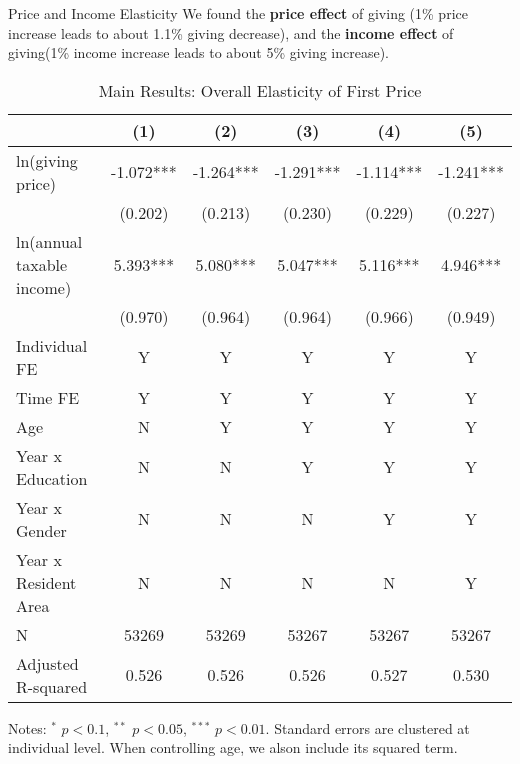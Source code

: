 \documentclass[
  ignorenonframetext,
  aspectratio=169,
]{beamer}
\begin{document}
\begin{frame}{Price and Income Elasticity}
\protect\hypertarget{price-and-income-elasticity}{}
We found the \textbf{price effect} of giving (1\% price increase leads to about 1.1\% giving decrease),
and the \textbf{income effect} of giving(1\% income increase leads to about 5\% giving increase).

\begin{table}

\caption{\label{tab:MainOverall}Main Results: Overall Elasticity of First Price}
\centering
\fontsize{7}{9}\selectfont
\begin{threeparttable}
\begin{tabular}[t]{lccccc}
\toprule
 & (1) & (2) & (3) & (4) & (5)\\
\midrule
ln(giving price) & -1.072*** & -1.264*** & -1.291*** & -1.114*** & -1.241***\\
 & (0.202) & (0.213) & (0.230) & (0.229) & (0.227)\\
ln(annual taxable income) & 5.393*** & 5.080*** & 5.047*** & 5.116*** & 4.946***\\
 & (0.970) & (0.964) & (0.964) & (0.966) & (0.949)\\
Individual FE & Y & Y & Y & Y & Y\\
Time FE & Y & Y & Y & Y & Y\\
Age & N & Y & Y & Y & Y\\
Year x Education & N & N & Y & Y & Y\\
Year x Gender & N & N & N & Y & Y\\
Year x Resident Area & N & N & N & N & Y\\
N & 53269 & 53269 & 53267 & 53267 & 53267\\
Adjusted R-squared & 0.526 & 0.526 & 0.526 & 0.527 & 0.530\\
\bottomrule
\end{tabular}
\begin{tablenotes}
\item Notes: $^{*}$ $p < 0.1$, $^{**}$ $p < 0.05$, $^{***}$ $p < 0.01$. Standard errors are clustered at individual level. When controlling age, we alson include its squared term.
\end{tablenotes}
\end{threeparttable}
\end{table}
\end{frame}
\end{document}
